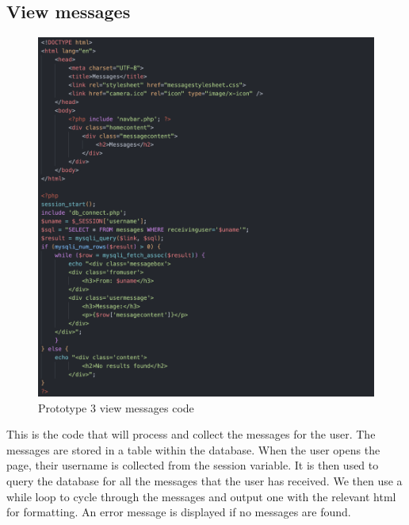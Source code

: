 \subsection{View messages}
  \begin{figure}[H]
    \centering
    \includegraphics[scale=0.6]{ch3_developing/proto3/messages.png}
    \caption{Prototype 3 view messages code}
    \label{fig:proto3_viewmessage}
\end{figure}
This is the code that will process and collect the messages for the user. The messages are stored in a table within the database. When the user opens the page, their username is collected from the session variable. It is then used to query the database for all the messages that the user has received. We then use a while loop to cycle through the messages and output one with the relevant html for formatting. An error message is displayed if no messages are found.


